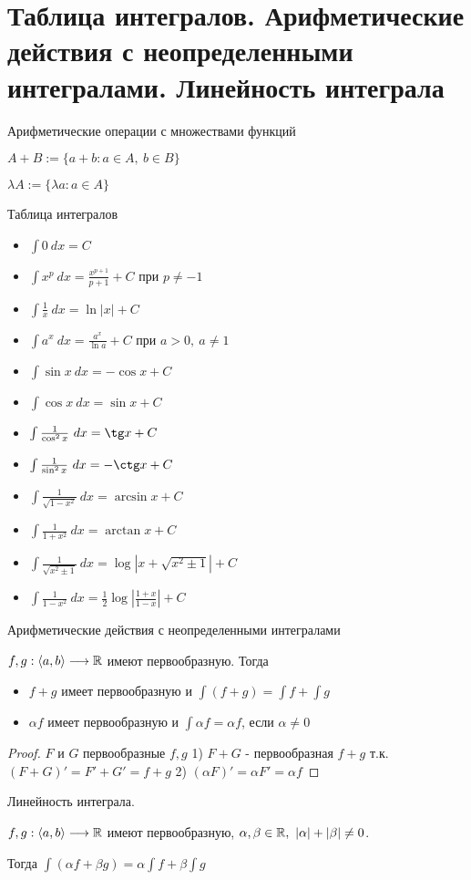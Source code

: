 \section{Таблица интегралов. Арифметические действия с неопределенными интегралами. Линейность интеграла \href{https://youtu.be/p9C57KDo1Yg?t=4373}{\Walley}}
\begin{conj}
    Арифметические операции с множествами функций

    $A+B := \{a+b: a \in A,\ b \in B\}$

    $\lambda A := \{ \lambda a : a \in A\}$
\end{conj}

Таблица интегралов

\begin{itemize}
    \item $\int 0\ dx = C$
    \item $\int x^p\ dx = \frac{x^{p+1}}{p+1} + C$ при $p \neq -1$
    \item $\int \frac{1}{x}\ dx = \ln |x| + C$
    \item $\int a^x\ dx = \frac{a^x}{\ln a} + C$ при $a > 0,\ a\neq 1$
    \item $\int \sin x\ dx = -\cos x + C$
    \item $\int \cos x\ dx = \sin x + C$
    \item $\int \frac{1}{\cos^2 x}\ dx = \tg x + C$
    \item $\int \frac{1}{\sin^2 x}\ dx = -\ctg x + C$
    \item $\int \frac{1}{\sqrt{1-x^2}}\ dx = \arcsin x + C$
    \item $\int \frac{1}{1+x^2}\ dx = \arctan x + C$
    \item $\int \frac{1}{\sqrt{x^2\pm 1}}\ dx = \log|x+\sqrt{x^2\pm 1}| + C$
    \item $\int \frac{1}{1-x^2}\ dx = \frac{1}{2}\log |\frac{1+x}{1-x}| + C$   
\end{itemize}

Арифметические действия с неопределенными интегралами

    $f, g: \langle a, b \rangle \longrightarrow \mathbb{R}$ имеют первообразную. Тогда
    \begin{itemize}
        \item $f+g$ имеет первообразную и $\int(f+g) = \int f + \int g$
        \item $\alpha f$ имеет первообразную и $\int \alpha f = \alpha f$, если $\alpha \neq 0$
    \end{itemize}

\begin{proof}
    $F$ и $G$ первообразные $f, g$
    1) $F+G$ - первообразная $f+g$ т.к. $(F+G)'=F'+G'=f+g$
    2) $(\alpha F)' = \alpha F' = \alpha f$
\end{proof}

\follow \; Линейность интеграла.

$f, g: \langle a, b \rangle \longrightarrow \mathbb{R}$ имеют первообразную, $\alpha, \beta \in \mathbb{R},\ |\alpha|+|\beta|\neq 0$.

Тогда $\int (\alpha f + \beta g) = \alpha \int f + \beta \int g$